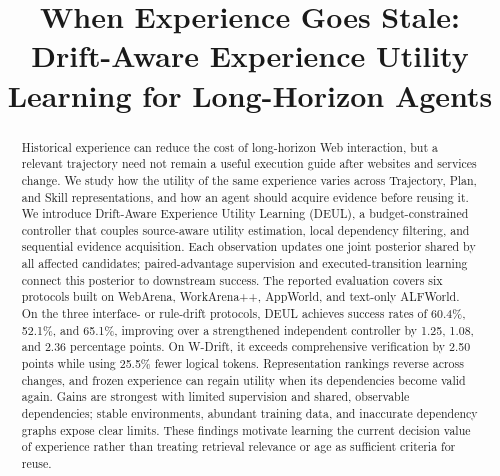 \documentclass[sigconf,anonymous,review]{acmart}
\theoremstyle{zhplain}
\begin{document}
\title[When Experience Goes Stale]{When Experience Goes Stale: Drift-Aware Experience Utility Learning for Long-Horizon Agents}
\begin{abstract}
Historical experience can reduce the cost of long-horizon Web interaction, but a relevant trajectory need not remain a useful execution guide after websites and services change. We study how the utility of the same experience varies across Trajectory, Plan, and Skill representations, and how an agent should acquire evidence before reusing it. We introduce Drift-Aware Experience Utility Learning (DEUL), a budget-constrained controller that couples source-aware utility estimation, local dependency filtering, and sequential evidence acquisition. Each observation updates one joint posterior shared by all affected candidates; paired-advantage supervision and executed-transition learning connect this posterior to downstream success. The reported evaluation covers six protocols built on WebArena, WorkArena++, AppWorld, and text-only ALFWorld. On the three interface- or rule-drift protocols, DEUL achieves success rates of 60.4\%, 52.1\%, and 65.1\%, improving over a strengthened independent controller by 1.25, 1.08, and 2.36 percentage points. On W-Drift, it exceeds comprehensive verification by 2.50 points while using 25.5\% fewer logical tokens. Representation rankings reverse across changes, and frozen experience can regain utility when its dependencies become valid again. Gains are strongest with limited supervision and shared, observable dependencies; stable environments, abundant training data, and inaccurate dependency graphs expose clear limits. These findings motivate learning the current decision value of experience rather than treating retrieval relevance or age as sufficient criteria for reuse.
\end{abstract}


\maketitle

\end{document}
